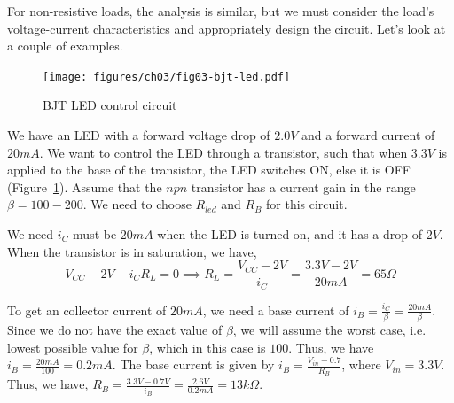 For non-resistive loads, the analysis is similar, but we must consider the load's voltage-current characteristics and appropriately design the circuit. Let's look at a couple of examples.

\begin{figure}[htbp]
    \centering
    \texttt{[image: figures/ch03/fig03-bjt-led.pdf]}
    \caption{BJT LED control circuit}
    \label{fig:03-bjt-led}
\end{figure}
\begin{boxedstuff}
    \begin{example}
        We have an LED with a forward voltage drop of $2.0V$ and a forward current of $20mA$. We want to control the LED through a transistor, such that when $3.3V$ is applied to the base of the transistor, the LED switches ON, else it is OFF (Figure~\ref{fig:03-bjt-led}). Assume that the $npn$ transistor has a current gain in the range $\beta = 100-200$. We need to choose $R_{led}$ and $R_B$ for this circuit.

        We need $i_C$ must be $20mA$ when the LED is turned on, and it has a drop of $2V$. When the transistor is in saturation, we have,
        \[ V_{CC} - 2V - i_C R_L = 0 \implies R_L = \frac{V_{CC} - 2V}{i_C} = \frac{3.3V - 2V}{20mA} = 65\Omega \]

        To get an collector current of $20mA$, we need a base current of $i_B = \frac{i_C}{\beta} = \frac{20mA}{\beta}$. Since we do not have the exact value of $\beta$, we will assume the worst case, i.e. lowest possible value for $\beta$, which in this case is $100$. Thus, we have $i_B = \frac{20mA}{100} = 0.2mA$. The base current is given by $i_B = \frac{V_{in} - 0.7}{R_B}$, where $V_{in} = 3.3V$. Thus, we have, $R_B = \frac{3.3V - 0.7V}{i_B} = \frac{2.6V}{0.2mA} = 13k\Omega$.
    \end{example}
\end{boxedstuff}

